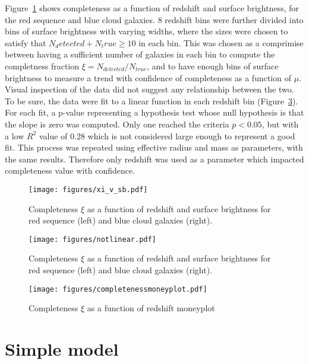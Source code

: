Figure~\ref{fig:xi_v_sb} shows completeness as a function of redshift and surface brightness, for the red sequence and blue cloud galaxies. 8 redshift bins were further divided into bins of surface brightness with varying widths, where the sizes were chosen to satisfy that $N_detected + N_true \ge 10$ in each bin. This was chosen as a comprimise between having a sufficient number of galaxies in each bin to compute the completness fraction $\xi = N_{detected}/N_{true}$, and to have enough bins of surface brightness to measure a trend with confidence of completeness as a function of $\mu$. Visual inspection of the data did not suggest any relationship between the two. To be sure, the data were fit to a linear function in each redshift bin (Figure~\ref{fig:notlinear}). For each fit, a p-value representing a hypothesis test whose null hypothesis is that the slope is zero was computed. Only one reached the criteria $p<0.05$, but with a low $R^{2}$ value of 0.28 which is not considered large enough to represent a good fit. This process was repeated using effective radius and mass as parameters, with the same results. Therefore only redshift was used as a parameter which impacted completeness value with confidence.  


\begin{figure}
\centering
\texttt{[image: figures/xi\_v\_sb.pdf]}
\caption{Completeness $\xi$ as a function of redshift and surface brightness for red sequence (left) and blue cloud galaxies (right).}
\label{fig:xi_v_sb}
\end{figure}

\begin{figure}
\centering
\texttt{[image: figures/notlinear.pdf]}
\caption{Completeness $\xi$ as a function of redshift and surface brightness for red sequence (left) and blue cloud galaxies (right).}
\label{fig:notlinear}
\end{figure}


\begin{figure}
\centering
\texttt{[image: figures/completenessmoneyplot.pdf]}
\caption{Completeness $\xi$ as a function of redshift moneyplot}
\label{fig:notlinear}
\end{figure}


\section{Simple model}

